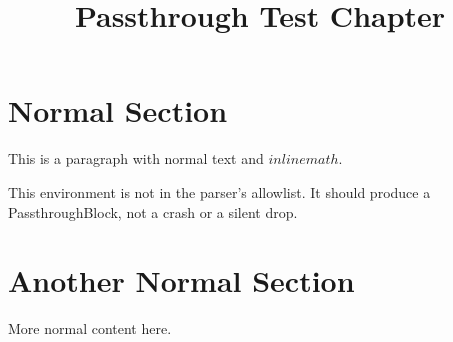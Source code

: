 \documentclass{article}
\title{Passthrough Test Chapter}
\begin{document}
\maketitle

\section{Normal Section}
This is a paragraph with normal text and $inline math$.

\begin{somethingweird}
This environment is not in the parser's allowlist.
It should produce a PassthroughBlock, not a crash or a silent drop.
\end{somethingweird}

\section{Another Normal Section}
More normal content here.
\end{document}
